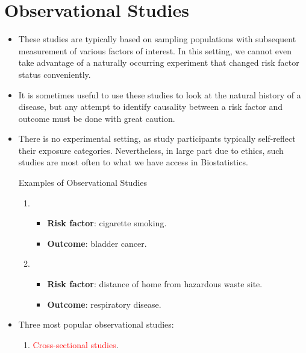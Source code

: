 \section{Observational Studies}
\begin{itemize}
      \item These studies are typically based on sampling populations with
            subsequent measurement of various factors of interest. In this
            setting, we cannot even take advantage of a naturally
            occurring experiment that changed risk factor status conveniently.
      \item It is sometimes useful to use these studies to look at the
            natural history of a disease, but any attempt to identify
            causality between a risk factor and outcome must be done with
            great caution.
      \item There is no experimental setting, as study participants
            typically self-reflect their exposure categories. Nevertheless, in
            large part due to ethics, such studies are most often to what
            we have access in Biostatistics.
            \begin{Example}{Examples of Observational Studies}
                  \begin{enumerate}
                        \item \begin{itemize}
                                    \item \textbf{Risk factor}: cigarette smoking.
                                    \item \textbf{Outcome}: bladder cancer.
                              \end{itemize}
                        \item \begin{itemize}
                                    \item \textbf{Risk factor}: distance of home from hazardous waste site.
                                    \item \textbf{Outcome}: respiratory disease.
                              \end{itemize}
                  \end{enumerate}
            \end{Example}
      \item Three most popular observational studies:
            \begin{enumerate}
                  \item \textcolor{Red}{Cross-sectional studies}.

\end{enumerate}
\end{itemize}
